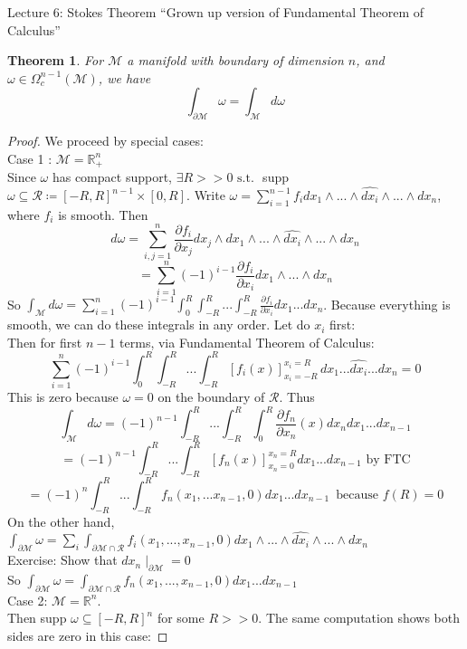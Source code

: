 \documentclass[10pt]{article}
\theoremstyle{plain}
\newtheorem{thm}{Theorem}[section] %
\theoremstyle{definition}
\newcommand{\st}{\text{ s.t. }}
\newcommand{\Real}{\mathbb{R}}
\newcommand{\man}{\mathcal{M}}
\newcommand{\allthewedge}[3]{{#1}_{#2}\wedge...\wedge{#1}_{#3}}
\newcommand{\compactpformman}[1]{\Omega^{#1}_c(\man)}
\newcommand{\iparderivof}[2]{\frac{\partial {#2}}{\partial x_{#1}}}
\newcommand{\dx}{dx}
\newcommand{\dw}{d\omega}
\newcommand{\sumfromto}[2]{\sum\limits_{#1}^{#2}}
\newcommand{\plusReal}{\Real_+ ^n}
\begin{document}
\begin{section}{Lecture 6: Stokes Theorem}
``Grown up version of Fundamental Theorem of Calculus''\\
\begin{thm}
For $\man$ a manifold with boundary of dimension $n$, and $\omega \in \compactpformman{n-1}$, we have $$\int_{\partial \man} \omega = \int_\man \dw$$
\end{thm}
\begin{proof}
We proceed by special cases:
\\Case 1 : $\man = \plusReal$\\
Since $\omega $ has compact support, $\exists R > > 0 \st $ supp $\omega \subseteq \mathcal{R} \coloneqq [-R,R]^{n-1} \times [0,R]$. Write $\omega = \sumfromto{i=1}{n-1} f_i \dx_1 \wedge ... \wedge \hat{\dx_i} \wedge ... \wedge \dx_n$, where $f_i$ is smooth. Then $$\dw = \sumfromto{i,j = 1}{n} \iparderivof{j}{f_i}\dx_j \wedge \dx_1 \wedge ... \wedge \hat{\dx_i} \wedge ... \wedge \dx_n$$
$$ = \sumfromto{i=1}{n} (-1)^{i-1} \iparderivof{i}{f_i} \allthewedge{\dx}{1}{n}$$
So $\int_\man \dw= \sumfromto{i=1}{n} (-1)^{i-1} \int_0^R \int_{-R}^R ... \int_{-R}^R\iparderivof{i}{f_i} \dx_1 ... \dx_n$. Because everything is smooth, we can do these integrals in any order. Let do $x_i$ first:
\\Then for first $n-1$ terms, via Fundamental Theorem of Calculus:
$$\sumfromto{i=1}{n} (-1)^{i-1} \int_0^R \int_{-R}^R ... \int_{-R}^R[f_i(x)]^{x_i = R}_{x_i = -R}\, \dx_1 ... \hat{\dx_i}... \dx_n = 0$$
This is zero because $\omega = 0$ on the boundary of $\mathcal{R}$. Thus $$\int_\man \dw = (-1)^{n-1} \int_{-R}^R ... \int_{-R}^R \int_0^R \iparderivof{n}{f_n} (x) \dx_n \dx_1... \dx_{n-1} $$
$$= (-1)^{n-1}\int_{-R}^R ... \int_{-R}^R [f_n(x)] ^{x_n = R} _ {x_n=0} \dx_1...\dx_{n-1} \text{ by FTC}$$
$$= (-1)^{n}\int_{-R}^R ... \int_{-R}^R f_n(x_1,...x_{n-1}, 0) \dx_1...\dx_{n-1} \, \text{ because } f(R) = 0 $$
On the other hand, $\int_{\partial \man} \omega = \sumfromto{i}{} \int_{\partial \man \cap \mathcal{R}} f_i(x_1,...,x_{n-1},0) \dx_1 \wedge ... \wedge \hat{\dx_i}\wedge ... \wedge \dx_n$\\
Exercise: Show that $\dx_n \mid _{\partial  \man} = 0$\\
So $\int_{\partial \man} \omega = \int_{\partial \man \cap \mathcal{R}} f_n(x_1,...,x_{n-1},0) \dx_1...\dx_{n-1}$\\
Case 2: $\man = \Real ^n$.\\
Then supp $\omega \subseteq [-R,R]^n$ for some $R>>0$. The same computation shows both sides are zero in this case: 

\end{proof}
\end{section}
\end{document}
